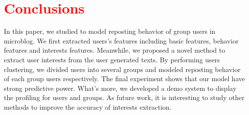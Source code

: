\section{\textcolor{red}{Conclusions}}
\label{sec:conclu}


In this paper, we studied to model reposting behavior of group users in microblog. We first extracted users's features including basic features, behavior features and interests features. Meanwhile, we proposed a novel method to extract user interests from the user generated texts. By performing users clustering, we divided users into several groups and modeled reposting behavior of each group users respectively. The final experiment shows that our model have strong predictive power. What's more, we developed a demo system to display the profiling for users and groups. As future work, it is interesting to study other methods to improve the accuracy of interests extraction.